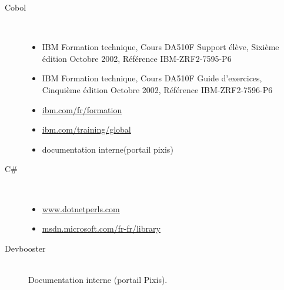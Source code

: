 \documentclass[a4paper,french,8pt]{article}
\begin{document}
		\begin{description}		
				\item[Cobol] \hfill \\
					\begin{itemize}
						\item IBM Formation technique, Cours DA510F Support élève, Sixième édition Octobre 2002, Référence IBM-ZRF2-7595-P6
						\item IBM Formation technique, Cours DA510F Guide d'exercices, Cinquième édition Octobre 2002, Référence IBM-ZRF2-7596-P6
						\item \url{ibm.com/fr/formation}
						\item \url{ibm.com/training/global}
						\item documentation interne(portail pixis)
					\end{itemize}
					
				\item[C\#] \hfill \\
					\begin{itemize}
						\item \url{www.dotnetperls.com}
						\item \url{msdn.microsoft.com/fr-fr/library}
					\end{itemize}

				\item[Devbooster] \hfill \\
					Documentation interne (portail Pixis).
		\end{description}

		
\end{document}
